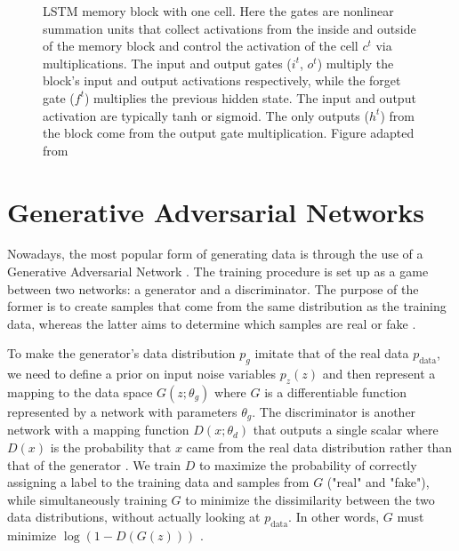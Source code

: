 \documentclass[a4paper]{book}
\begin{document}
\begin{figure}[t]
    \caption{LSTM memory block with one cell. Here the gates are nonlinear summation units that collect activations from the inside and outside of the memory block and control the activation of the cell $c^t$ via multiplications. The input and output gates ($i^t$, $o^t$) multiply the block's input and output activations respectively, while the forget gate ($f^t$) multiplies the previous hidden state. The input and output activation are typically tanh or sigmoid. The only outputs ($h^t$) from the block come from the output gate multiplication. Figure adapted from \textcite{graves_supervised_2012}}
    \label{fig:lstm}
\end{figure}

\section{Generative Adversarial Networks} \label{sec:generative}

Nowadays, the most popular form of generating data is through the use of a Generative Adversarial Network \parencite[GAN;][]{goodfellow_generative_2014}. The training procedure is set up as a game between two networks: a generator and a discriminator. The purpose of the former is to create samples that come from the same distribution as the training data, whereas the latter aims to determine which samples are real or fake \parencite{goodfellow_nips_2016}.

To make the generator's data distribution $p_g$ imitate that of the real data $p_{\text{data}}$, we need to define a prior on input noise variables $p_{z}(z)$ and then represent a mapping to the data space $G(z; \theta_g)$ where $G$ is a differentiable function represented by a network with parameters $\theta_g$. The discriminator is another network with a mapping function $D(x; \theta_d)$ that outputs a single scalar where $D(x)$ is the probability that $x$ came from the real data distribution rather than that of the generator \parencite{goodfellow_nips_2016}. We train $D$ to maximize the probability of correctly assigning a label to the training data and samples from $G$ ("real" and "fake"), while simultaneously training $G$ to minimize the dissimilarity between the two data distributions, without actually looking at $p_{\text{data}}$. In other words, $G$ must minimize $\log (1- D(G(z)))$ \parencite{goodfellow_generative_2014}.
\end{document}
